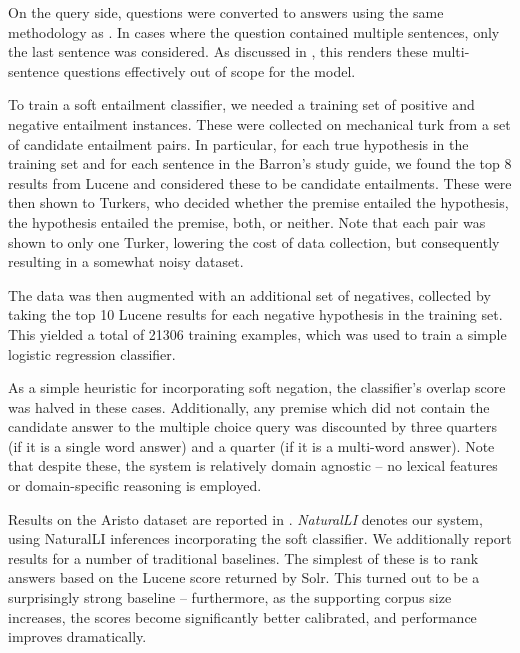 On the query side, questions were converted to answers using the same methodology as
  .
In cases where the question contained multiple sentences, only the last sentence
  was considered.
As discussed in , 
  this renders these multi-sentence questions effectively out of scope for the model.

%
%
To train a soft entailment classifier, we needed a training set of positive
  and negative entailment instances.
These were collected on mechanical turk from a set of candidate entailment pairs.
In particular, for each true hypothesis in the training set and for each sentence
  in the Barron's study guide, we found the top 8 results from Lucene and considered
  these to be candidate entailments.
These were then shown to Turkers, who decided whether the premise entailed the
  hypothesis, the hypothesis entailed the premise, both, or neither.
Note that each pair was shown to only one Turker, lowering the cost of
  data collection, but consequently resulting in a somewhat noisy dataset.

The data was then augmented with an additional set of negatives, collected by taking
  the top 10 Lucene results for each negative hypothesis in the training set.
This yielded a total of \num{21306} training examples, which was used to train
  a simple logistic regression classifier.

As a simple heuristic for incorporating soft negation, the classifier's overlap
  score was halved in these cases.
Additionally, any premise which did not contain the candidate answer to the
  multiple choice query was discounted by three quarters (if it is a single
  word answer) and a quarter (if it is a multi-word answer).
Note that despite these, the system is relatively domain agnostic -- no
  lexical features or domain-specific reasoning is employed.

%
%
Results on the Aristo dataset are reported in .
\textit{NaturalLI} denotes our system, using NaturalLI inferences incorporating
  the soft classifier.
%
We additionally report results for a number of traditional baselines.
The simplest of these is to rank answers based on the Lucene score returned by
  Solr.
This turned out to be a surprisingly strong baseline -- furthermore, as the supporting
  corpus size increases, the scores become significantly better calibrated, and
  performance improves dramatically.

